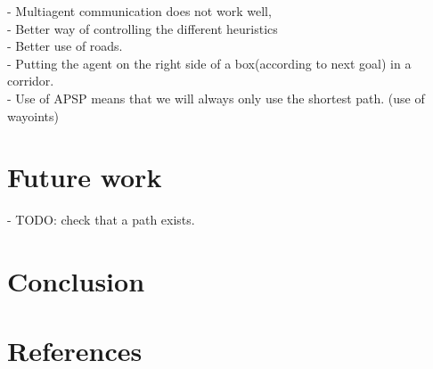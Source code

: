 \documentclass[letterpaper]{article}
\begin{document}
- Multiagent communication does not work well,\\
- Better way of controlling the different heuristics\\
- Better use of roads.\\
- Putting the agent on the right side of a box(according to next goal) in a corridor.\\
- Use of APSP means that we will always only use the shortest path. (use of wayoints)\\
\section{Future work}
- TODO: check that a path exists.\\
\section{Conclusion}
\section{References}


\end{document}
